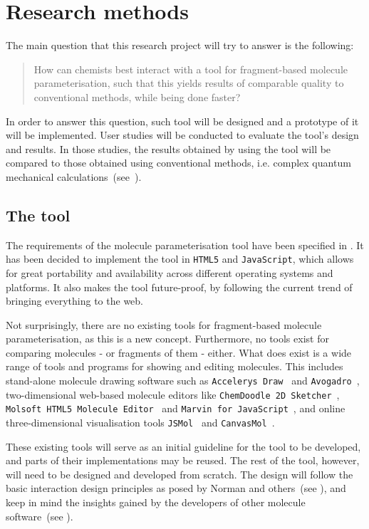 \chapter{Research methods}

The main question that this research project will try to answer is the following:
\begin{quote}
How can chemists best interact with a tool for fragment-based molecule parameterisation, such that this yields results of comparable quality to conventional methods, while being done faster?
\end{quote}
In order to answer this question, such tool will be designed and a prototype of it will be implemented. User studies will be conducted to evaluate the tool's design and results. In those studies, the results obtained by using the tool will be compared to those obtained using conventional methods, i.e. complex quantum mechanical calculations~(see~).


\section{The tool}

The requirements of the molecule parameterisation tool have been specified in . It has been decided to implement the tool in \verb|HTML5| and \verb|JavaScript|, which allows for great portability and availability across different operating systems and platforms. It also makes the tool future-proof, by following the current trend of bringing everything to the web.

Not surprisingly, there are no existing tools for fragment-based molecule parameterisation, as this is a new concept. Furthermore, no tools exist for comparing molecules - or fragments of them - either. What does exist is a wide range of tools and programs for showing and editing molecules. This includes stand-alone molecule drawing software such as \verb|Accelerys Draw|~\cite{accelrys2012accelrys} and \verb|Avogadro|~\cite{hanwell2012avogadro}, two-dimensional web-based molecule editors like \verb|ChemDoodle 2D Sketcher|~\cite{ichemlabs2013chemdoodle}, \verb|Molsoft HTML5 Molecule Editor|~\cite{molsoft2012molsoft} and \verb|Marvin for JavaScript|~\cite{chemxon2013marvin}, and online three-dimensional visualisation tools \verb|JSMol|~\cite{hanson2013jsmol} and \verb|CanvasMol|~\cite{altered2013canvasmol}.

These existing tools will serve as an initial guideline for the tool to be developed, and parts of their implementations may be reused. The rest of the tool, however, will need to be designed and developed from scratch. The design will follow the basic interaction design principles as posed by Norman and others~(see ), and keep in mind the insights gained by the developers of other molecule software~(see ).

